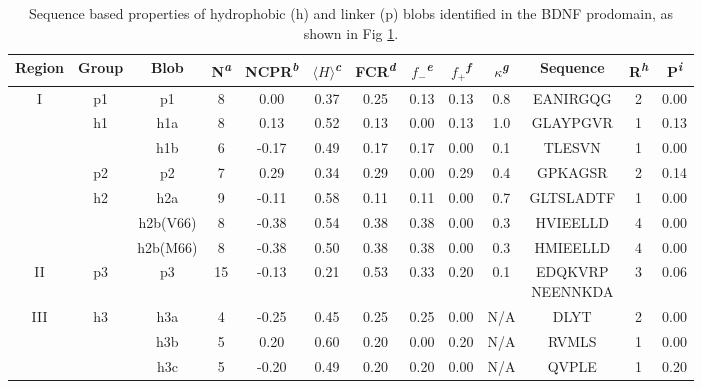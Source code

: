 \documentclass[10pt,letterpaper]{article}
\begin{document}
\begin{figure}[!ht]
\label{fig1} 
\end{figure}


\begin{table}[!ht]
\begin{adjustwidth}{-2.25in}{0in} %
\centering
\caption{Sequence based properties of hydrophobic (h) and linker (p) blobs identified in the BDNF prodomain, as shown in Fig \ref{fig1}.}
\label{table1}
\begin{tabular}{|c|c|c|c|c|c|c|c|c|c|c|c|c|}
\hline
Region & Group & Blob & N\textsuperscript{\emph{a}} & NCPR\textsuperscript{\emph{b}} & $\langle H \rangle$\textsuperscript{\emph{c}} & FCR\textsuperscript{\emph{d}} & $f_{-}$\textsuperscript{\emph{e}} & $f_{+}$\textsuperscript{\emph{f}} & $\kappa$\textsuperscript{\emph{g}} & Sequence & R\textsuperscript{\emph{h}} & P\textsuperscript{\emph{i}} \\
\hline\hline
\multirow{7}{*}{I} &p1 & p1 & 8 & 0.00 & 0.37 & 0.25 & 0.13 & 0.13 & 0.8 & EANIRGQG & 2 & 0.00\\ 
\hhline{~------------}
 &\multirow{2}{*}{h1}&h1a & 8 & 0.13 & 0.52 & 0.13 & 0.00 & 0.13 & 1.0 & GLAYPGVR & 1 & 0.13\\ \cline{4-13}
\hhline{~~-----------}
& &h1b & 6 & -0.17 & 0.49 & 0.17 & 0.17 & 0.00 & 0.1 & TLESVN & 1 & 0.00\\ 
\hhline{~------------}
& p2&p2 & 7 & 0.29 & 0.34 & 0.29 & 0.00 & 0.29 & 0.4 & GPKAGSR & 2 & 0.14\\
\hhline{~------------}
&\multirow{3}{*}{h2}&h2a & 9 & -0.11 & 0.58 & 0.11 & 0.11 & 0.00 & 0.7 & GLTSLADTF & 1 & 0.00\\
\hhline{~~-----------}
&&h2b(V66) & 8 & -0.38 & 0.54 & 0.38 & 0.38 & 0.00 & 0.3 & HVIEELLD & 4 & 0.00\\
\hhline{~~-----------}
&&h2b(M66) & 8 & -0.38 & 0.50 & 0.38 & 0.38 & 0.00 & 0.3 & HMIEELLD & 4 & 0.00\\
\hhline{-------------}
II&p3&p3 & 15 & -0.13 & 0.21 & 0.53 & 0.33 & 0.20 & 0.1 & \makecell{EDQKVRP \\ NEENNKDA} & 3 & 0.06\\
\hline
\multirow{4}{*}{III}&\multirow{4}{*}{h3}&h3a & 4 & -0.25 & 0.45 & 0.25 & 0.25 & 0.00 & N/A & DLYT & 2 & 0.00\\
\hhline{~~-----------}
&&h3b & 5 & 0.20 & 0.60 & 0.20 & 0.00 & 0.20 & N/A & RVMLS & 1 & 0.00\\
\hhline{~~-----------}
&&h3c & 5 & -0.20 & 0.49 & 0.20 & 0.20 & 0.00 &N/A & QVPLE & 1 & 0.20\\

\end{tabular}
\end{adjustwidth}
\end{table}
\end{document}
